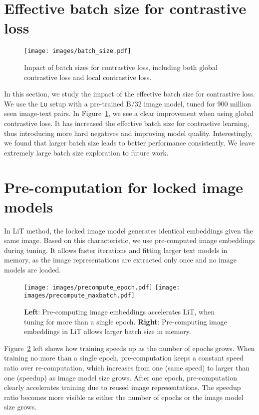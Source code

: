 \documentclass[10pt,twocolumn,letterpaper]{article}
\def \lit {LiT\xspace}
\def \Lu {{\tt Lu}\xspace}
\begin{document}
\section{Effective batch size for contrastive loss}
\label{appendix:batch_size}

\begin{figure}[t]
    \centering
    \texttt{[image: images/batch\_size.pdf]}
    \caption{Impact of batch sizes for contrastive loss, including both global contrastive loss and local contrastive loss.}
    \label{fig:batch_size}
\end{figure}

In this section, we study the impact of the effective batch size for contrastive loss.
We use the \Lu setup with a pre-trained B/32 image model, tuned for 900 million seen image-text pairs.
In Figure~\ref{fig:batch_size}, we see a clear improvement when using global contrastive loss.
It has increased the effective batch size for contrastive learning, thus introducing more hard negatives and improving model quality.
Interestingly, we found that larger batch size leads to better performance consistently.
We leave extremely large batch size exploration to future work.



\section{Pre-computation for locked image models}
\label{appendix:precompute}

In \lit{} method, the locked image model generates identical embeddings given the same image. 
Based on this characteristic, we use pre-computed image embeddings during tuning.
It allows faster iterations and fitting larger text models in memory, as the image representations are extracted only once and no image models are loaded. 

\begin{figure}[t]
    \centering
    \texttt{[image: images/precompute\_epoch.pdf]}
    \texttt{[image: images/precompute\_maxbatch.pdf]}
    \caption{\textbf{Left}: Pre-computing image embeddings accelerates \lit{}, when tuning for more than a single epoch. 
    \textbf{Right}: Pre-computing image embeddings in \lit{} allows larger batch size in memory.}
    \label{fig:precompute}
\end{figure}

Figure~\ref{fig:precompute} left shows how training speeds up as the number of epochs grows.
When training no more than a single epoch, pre-computation keeps a constant speed ratio over re-computation, which increases from one (same speed) to larger than one (speedup) as image model size grows.
After one epoch, pre-computation clearly accelerates training due to reused image representations. 
The speedup ratio becomes more visible as either the number of epochs or the image model size grows.
\end{document}
